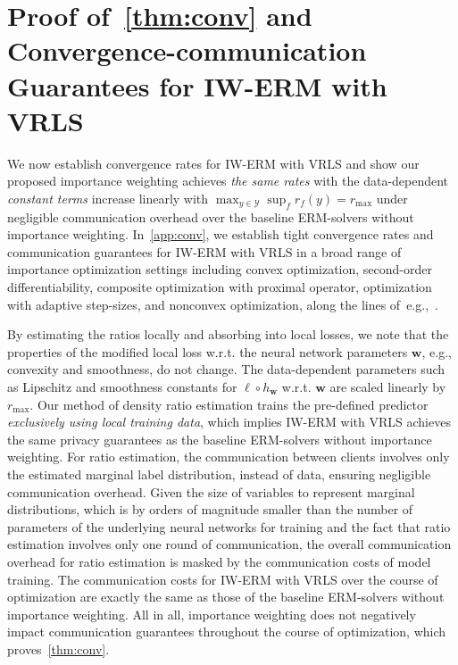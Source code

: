 \section{Proof of~\texorpdfstring{\cref{thm:conv}}{Theorem Reference} and Convergence-communication Guarantees for IW-ERM with VRLS\label{app:conv}}

We now establish convergence rates for IW-ERM with VRLS and show our proposed importance weighting achieves {\it the same rates} with the data-dependent {\it constant terms} increase linearly with $\max_{y \in \mathcal{Y}}\sup_f r_f(y)=r_{\max}$ under negligible communication overhead over the baseline  ERM-solvers without importance weighting. In~\cref{app:conv}, we establish tight convergence rates and communication guarantees for IW-ERM with VRLS in a broad range of importance optimization settings including convex optimization, second-order differentiability, composite optimization with proximal operator, optimization with adaptive step-sizes, and nonconvex optimization, along the lines of~e.g.,~\citep{woodworth2020local,haddadpour2021federated,glasgow2022sharp,liu2023high,Prox,AdaptiveFL,liu2023high}. 

By estimating the ratios locally and absorbing into local losses, we note that the properties of the modified local loss w.r.t. the neural network parameters $\boldsymbol{w}$, e.g., convexity and smoothness, do not change. The data-dependent parameters such as Lipschitz and smoothness constants for $\ell\circ h_{\boldsymbol{w}}$ w.r.t. $\boldsymbol{w}$ are scaled linearly by $r_{\max}$. Our method of density ratio estimation trains the pre-defined predictor {\it exclusively using local training data}, which implies IW-ERM with VRLS achieves the same privacy guarantees as the baseline  ERM-solvers without importance weighting. For ratio estimation, the communication between clients involves only the estimated marginal label distribution, instead of data, ensuring  negligible communication overhead. 
Given the size of variables to represent marginal distributions, which is by orders of magnitude smaller than the number of parameters of the underlying neural networks for training and the fact that ratio estimation involves only one round of communication, the overall communication overhead for ratio estimation is masked by the communication costs of model training. The communication costs for IW-ERM with VRLS over the course of optimization are exactly the same as those of the baseline  ERM-solvers without importance weighting. All in all, importance weighting does not negatively impact  communication guarantees throughout the course of optimization, which proves~\cref{thm:conv}.

